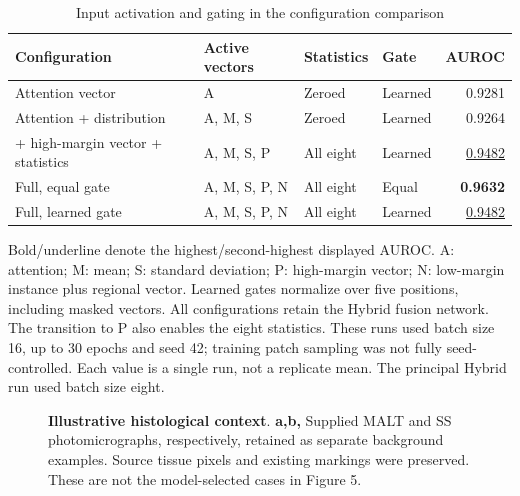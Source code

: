 \clearpage
\begin{table}[H]\centering
\caption{Input activation and gating in the configuration comparison}\label{tab:S9}
\small
\begin{tabularx}{\textwidth}{@{}>{\raggedright\arraybackslash}Xlllr@{}}
\toprule
Configuration & Active vectors & Statistics & Gate & AUROC \\
\midrule
Attention vector & A & Zeroed & Learned & 0.9281 \\
Attention + distribution & A, M, S & Zeroed & Learned & 0.9264 \\
+ high-margin vector + statistics & A, M, S, P & All eight & Learned & \underline{0.9482} \\
Full, equal gate & A, M, S, P, N & All eight & Equal & \textbf{0.9632} \\
Full, learned gate & A, M, S, P, N & All eight & Learned & \underline{0.9482} \\
\bottomrule
\end{tabularx}
\par\medskip\footnotesize Bold/underline denote the highest/second-highest displayed AUROC. A: attention; M: mean; S: standard deviation; P: high-margin vector; N: low-margin instance plus regional vector. Learned gates normalize over five positions, including masked vectors. All configurations retain the Hybrid fusion network. The transition to P also enables the eight statistics. These runs used batch size 16, up to 30 epochs and seed 42; training patch sampling was not fully seed-controlled. Each value is a single run, not a replicate mean. The principal Hybrid run used batch size eight.
\end{table}

\begin{figure}[H]\centering
{}
\caption{\textbf{Illustrative histological context}. \textbf{a,b,} Supplied MALT and SS photomicrographs, respectively, retained as separate background examples. Source tissue pixels and existing markings were preserved. These are not the model-selected cases in Figure 5. }\label{fig:S2}
\end{figure}

